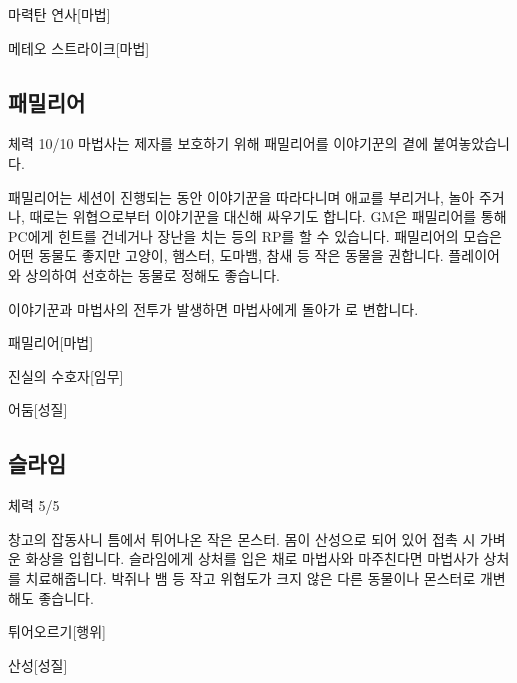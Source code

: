 \documentclass{report}
\begin{document}
		\begin{spoiler}{마력탄 연사}{[마법]}
		\end{spoiler}
		
		\begin{spoiler}{메테오 스트라이크}{[마법]}
		\end{spoiler}
	
	\subsection*{패밀리어}
		체력 10/10
		마법사는 제자를 보호하기 위해 패밀리어를 이야기꾼의 곁에 붙여놓았습니다.
		
		패밀리어는 세션이 진행되는 동안 이야기꾼을 따라다니며 애교를 부리거나, 놀아 주거나, 때로는 위협으로부터 이야기꾼을 대신해 싸우기도 합니다. GM은 패밀리어를 통해 PC에게 힌트를 건네거나 장난을 치는 등의 RP를 할 수 있습니다. 패밀리어의 모습은 어떤 동물도 좋지만 고양이, 햄스터, 도마뱀, 참새 등 작은 동물을 권합니다. 플레이어와 상의하여 선호하는 동물로 정해도 좋습니다.
		
		이야기꾼과 마법사의 전투가 발생하면 마법사에게 돌아가 로 변합니다.
		
		\begin{spoiler}{패밀리어}{[마법]}
		\end{spoiler}
		
		\begin{spoiler}{진실의 수호자}{[임무]}
		\end{spoiler}
		
		\begin{spoiler}{어둠}{[성질]}
		\end{spoiler}
	
	\subsection*{슬라임}
		체력 5/5
		
		창고의 잡동사니 틈에서 튀어나온 작은 몬스터. 몸이 산성으로 되어 있어 접촉 시 가벼운 화상을 입힙니다. 슬라임에게 상처를 입은 채로 마법사와 마주친다면 마법사가 상처를 치료해줍니다. 박쥐나 뱀 등 작고 위협도가 크지 않은 다른 동물이나 몬스터로 개변해도 좋습니다.
		
		\begin{spoiler}{튀어오르기}{[행위]}
		\end{spoiler}
		
		\begin{spoiler}{산성}{[성질]}
		\end{spoiler}
	
\end{document}
